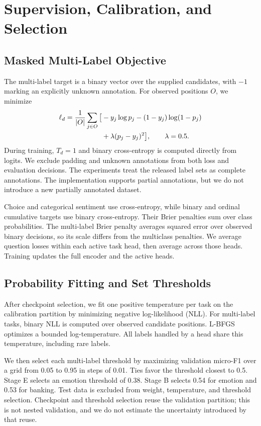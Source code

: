 \documentclass[conference]{IEEEtran}
\begin{document}
\section{Supervision, Calibration, and Selection}
\subsection{Masked Multi-Label Objective}
The multi-label target is a binary vector over the supplied candidates, with $-1$ marking an explicitly unknown annotation. For observed positions $O$, we minimize
\begin{align}
\ell_d={1\over|O|}\sum_{j\in O}\big[&-y_j\log p_j-(1-y_j)\log(1-p_j)\nonumber\\
&+\lambda(p_j-y_j)^2\big],\qquad\lambda=0.5.
\end{align}
During training, $T_d=1$ and binary cross-entropy is computed directly from logits. We exclude padding and unknown annotations from both loss and evaluation decisions. The experiments treat the released label sets as complete annotations. The implementation supports partial annotations, but we do not introduce a new partially annotated dataset.

Choice and categorical sentiment use cross-entropy, while binary and ordinal cumulative targets use binary cross-entropy. Their Brier penalties sum over class probabilities. The multi-label Brier penalty averages squared error over observed binary decisions, so its scale differs from the multiclass penalties. We average question losses within each active task head, then average across those heads. Training updates the full encoder and the active heads.

\subsection{Probability Fitting and Set Thresholds}
After checkpoint selection, we fit one positive temperature per task on the calibration partition by minimizing negative log-likelihood (NLL). For multi-label tasks, binary NLL is computed over observed candidate positions. L-BFGS optimizes a bounded log-temperature. All labels handled by a head share this temperature, including rare labels.

We then select each multi-label threshold by maximizing validation micro-F1 over a grid from 0.05 to 0.95 in steps of 0.01. Ties favor the threshold closest to 0.5. Stage E selects an emotion threshold of 0.38. Stage B selects 0.54 for emotion and 0.53 for banking. Test data is excluded from weight, temperature, and threshold selection. Checkpoint and threshold selection reuse the validation partition; this is not nested validation, and we do not estimate the uncertainty introduced by that reuse.
\end{document}
